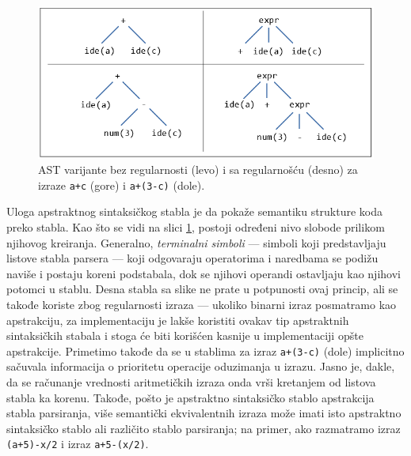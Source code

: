 \begin{figure}[h!]
\centering
\includegraphics[scale=0.7]{images/ast.png}
\caption{AST varijante bez regularnosti (levo) i sa regularnošću (desno) za izraze \texttt{a+c} (gore) i \texttt{a+(3-c)} (dole).} 
\label{fig:ASTVariants}
\end{figure}

Uloga apstraktnog sintaksičkog stabla \cite{FormalSyntaxAndSemantics} je da pokaže semantiku strukture koda preko stabla. Kao što se vidi na slici \ref{fig:ASTVariants}, postoji određeni nivo slobode prilikom njihovog kreiranja. Generalno, \emph{terminalni simboli} --- simboli koji predstavljaju listove stabla parsera --- koji odgovaraju operatorima i naredbama se podižu naviše i postaju koreni podstabala, dok se njihovi operandi ostavljaju kao njihovi potomci u stablu. Desna stabla sa slike ne prate u potpunosti ovaj princip, ali se takođe koriste zbog regularnosti izraza --- ukoliko binarni izraz posmatramo kao apstrakciju, za implementaciju je lakše koristiti ovakav tip apstraktnih sintaksičkih stabala i stoga će biti korišćen kasnije u implementaciji opšte apstrakcije. Primetimo takođe da se u stablima za izraz \texttt{a+(3-c)} (dole) implicitno sačuvala informacija o prioritetu operacije oduzimanja u izrazu. Jasno je, dakle, da se računanje vrednosti aritmetičkih izraza onda vrši kretanjem od listova stabla ka korenu. Takođe, pošto je apstraktno sintaksičko stablo apstrakcija stabla parsiranja, više semantički ekvivalentnih izraza može imati isto apstraktno sintaksičko stablo ali različito stablo parsiranja; na primer, ako razmatramo izraz \texttt{(a+5)-x/2} i izraz \texttt{a+5-(x/2)}.

